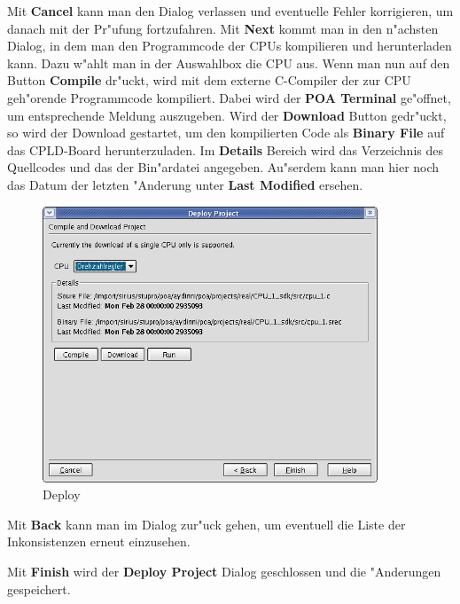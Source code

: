 \documentclass[a4paper,titlepage,12pt,ngerman]{scrbook}
\begin{document}
Mit {\bf Cancel} kann man den Dialog verlassen und eventuelle Fehler korrigieren, um danach mit der Pr"ufung fortzufahren.\newline
Mit {\bf Next} kommt man in den n"achsten Dialog, in dem man den Programmcode der CPUs kompilieren und herunterladen kann. Dazu w"ahlt man in der Auswahlbox die CPU aus. Wenn man nun auf den Button {\bf Compile} dr"uckt, wird mit dem externe C-Compiler der zur CPU geh"orende Programmcode kompiliert. Dabei wird der {\bf POA Terminal} ge"offnet, um entsprechende Meldung auszugeben. Wird der {\bf Download} Button gedr"uckt, so wird der Download gestartet, um den kompilierten Code als {\bf Binary File} auf das CPLD-Board herunterzuladen.
Im {\bf Details} Bereich wird das Verzeichnis des Quellcodes und das der Bin"ardatei angegeben. Au"serdem kann man hier noch das Datum der letzten "Anderung unter {\bf Last Modified} ersehen.\par
\begin{figure}[htbp]

\begin{center}

\includegraphics[width=10cm]{Deploy2}

\caption{Deploy}\label{test}

\end{center}
\end{figure}
Mit {\bf Back} kann man im Dialog zur"uck gehen, um eventuell die Liste der Inkonsistenzen erneut einzusehen.\par
Mit {\bf Finish} wird der {\bf Deploy Project} Dialog geschlossen und die "Anderungen gespeichert.

%
\end{document}
